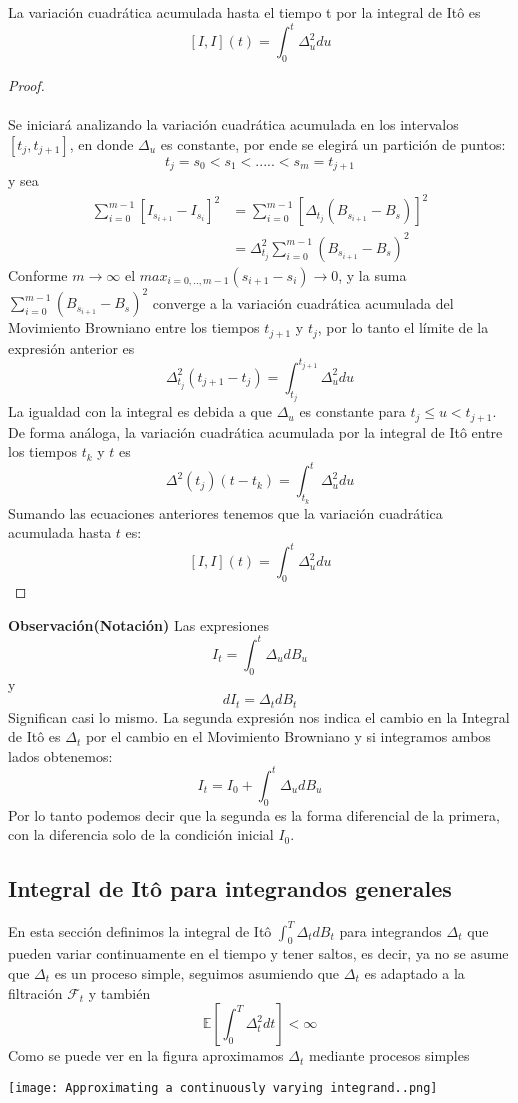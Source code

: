\documentclass[11pt,notitlepage]{article}
\begin{document}
\begin{teor}
La variación cuadrática acumulada hasta el tiempo t por la integral de Itô es
\[[I,I](t)= \int_{0}^{t}\Delta^{2}_{u}du\]
\end{teor}

\begin{proof} \\ \\
Se iniciará analizando la variación cuadrática acumulada en los intervalos \([t_j,t_{j+1}]\), en donde \(\Delta_{u}\) es constante, por ende se elegirá un partición de puntos: 
\[t_j=s_0<s_1<.....<s_m=t_{j+1}\]
y sea 
\begin{align}
\sum_{i=0}^{m-1}[I_{s_{i+1}}-I_{s_i}]^{2} &=\sum_{i=0}^{m-1}[\Delta_{t_j}(B_{s_{i+1}}-B_{s})]^{2}  \\ 
 &= \Delta^{2}_{t_j}\sum_{i=0}^{m-1}(B_{s_{i+1}}-B_{s})^{2}
\end{align}
 Conforme \(m \to \infty \) el \(max_{i=0,..,m-1}(s_{i+1}-s_{i}) \to 0\), y la suma
 \(\sum_{i=0}^{m-1}(B_{s_{i+1}}-B_{s})^{2}\) converge a la variación cuadrática acumulada del Movimiento Browniano entre los tiempos \(t_{j+1}\) y \(t_j\), por lo tanto el límite de la expresión anterior es
 \[\Delta^{2}_{t_j}(t_{j+1}-t_j)=\int_{t_j}^{t_{j+1}}\Delta^{2}_{u}du\]
La igualdad con la integral es debida a que \(\Delta_{u}\) es constante para \(t_j \leq u < t_{j+1}\). De forma análoga, la variación cuadrática acumulada por la integral de Itô entre los tiempos \(t_k\) y \(t\) es
\[\Delta^2(t_j)(t-t_k)=\int_{t_k}^{t}\Delta^{2}_{u}du\]
Sumando las ecuaciones anteriores tenemos que la variación cuadrática acumulada hasta \(t\) es:
\[[I,I](t)= \int_{0}^{t}\Delta^{2}_{u}du\]
\end{proof} 

\textbf{Observación(Notación)}
Las expresiones
\[I_{t}=\int_{0}^{t}\Delta_{u}dB_u\] y
\[dI_{t}=\Delta_{t}dB_t\]
Significan casi lo mismo. La segunda expresión nos indica el cambio en la Integral de Itô es \(\Delta_{t}\) por el cambio en el Movimiento Browniano y si integramos ambos lados obtenemos:
\[I_{t}=I_{0}+\int_{0}^{t}\Delta_{u}dB_u\]
Por lo tanto podemos decir que la segunda es la forma diferencial de la primera, con la diferencia solo de la condición inicial \(I_{0}\).


\subsection{Integral de Itô para integrandos generales}
En esta sección definimos la integral de Itô \( \int_{0}^{T}\Delta_{t}dB_t\) para integrandos \(\Delta_{t}\) que pueden variar continuamente en el tiempo y tener saltos, es decir, ya no se asume que \(\Delta_{t}\) es un proceso simple, seguimos asumiendo que  \(\Delta_{t}\) es adaptado a la filtración \(\mathcal{F}_t\) y también 
\[\mathbb{E}\left[\int_{0}^{T}\Delta^{2}_{t}dt\right] < \infty\]
Como se puede ver en la figura aproximamos \(\Delta_{t}\) mediante procesos simples
\begin{center}
  \texttt{[image: Approximating a continuously varying integrand..png]}    
\end{center}
\end{document}
